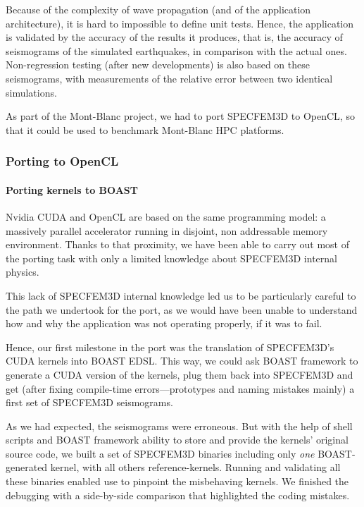 \documentclass{IEEEtran}
\begin{document}
Because of the complexity of wave propagation (and of the application
architecture), it is hard to impossible to define unit tests. Hence,
the application is validated by the accuracy of the results it
produces, that is, the accuracy of seismograms of the simulated
earthquakes, in comparison with the actual ones. Non-regression
testing (after new developments) is also based on these seismograms,
with measurements of the relative error between two identical
simulations.

As part of the Mont-Blanc project, we had to port SPECFEM3D to OpenCL, so
that it could be used to benchmark Mont-Blanc HPC platforms.

\subsubsection{Porting to OpenCL}

\paragraph{Porting kernels to BOAST}  Nvidia CUDA and OpenCL are based on the same programming model: a
massively parallel accelerator running in disjoint, non addressable
memory environment. Thanks to that proximity, we have been able to carry
out most of the porting task with only a limited knowledge about
SPECFEM3D internal physics.

This lack of SPECFEM3D internal knowledge led us to be particularly
careful to the path we undertook for the port, as we would have
been unable to understand how and why the application was not
operating properly, if it was to fail.

Hence, our first milestone in the port was the translation of
SPECFEM3D's CUDA kernels into BOAST EDSL. This way, we could ask BOAST
framework to generate a CUDA version of the kernels, plug them back
into SPECFEM3D and get (after fixing compile-time errors---prototypes
and naming mistakes mainly) a first set of SPECFEM3D seismograms.

As we had expected, the seismograms were erroneous. But with the help
of shell scripts and BOAST framework ability to store and provide the
kernels' original source code, we built a set of SPECFEM3D binaries
including only \emph{one} BOAST-generated kernel, with all others
reference-kernels. Running and validating all these binaries enabled
use to pinpoint the misbehaving kernels. We finished the debugging
with a side-by-side comparison that highlighted the coding mistakes.
\end{document}

